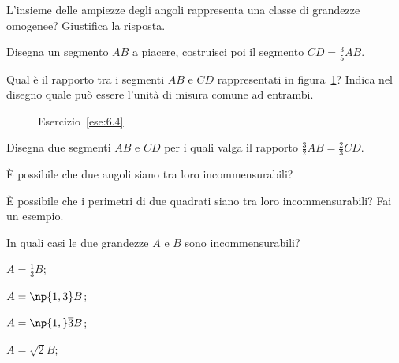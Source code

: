 \begin{esercizio}
\label{ese:6.2}
L'insieme delle ampiezze degli angoli rappresenta una classe di 
grandezze omogenee? Giustifica la risposta.
\end{esercizio}

\begin{esercizio}
\label{ese:6.3}
Disegna un segmento $AB$ a piacere, costruisci poi il segmento 
$CD=\frac{3}{5}AB$.
\end{esercizio}

\begin{esercizio}
\label{ese:6.4}
Qual è il rapporto tra i segmenti $AB$ e $CD$ rappresentati in 
figura~\ref{fig:ese6.4}? Indica nel disegno quale può essere l'unità 
di misura comune ad entrambi.
\end{esercizio}
\begin{inaccessibleblock}
 \begin{figure}[!htb]
  \centering
  \caption{Esercizio~\ref{ese:6.4}}\label{fig:ese6.4}
\end{figure}
\end{inaccessibleblock}

\begin{esercizio}
\label{ese:6.5}
Disegna due segmenti $AB$ e $CD$ per i quali valga il rapporto 
$\frac{3}{2}AB=\frac{2}{3}CD$.
\end{esercizio}

\begin{esercizio}
\label{ese:6.6}
È possibile che due angoli siano tra loro incommensurabili?
\end{esercizio}

\begin{esercizio}
\label{ese:6.7}
È possibile che i perimetri di due quadrati siano tra loro 
incommensurabili? Fai un esempio.
\end{esercizio}

\begin{esercizio}
\label{ese:6.8}
In quali casi le due grandezze $A$ e $B$ sono incommensurabili?
\begin{multicols}{4}
\begin{enumeratea}
\item $A=\frac{1}{3}B$;
\item $A=\np{1,3}B$;
\item $A=\np{1,}\overline{3}B$;
\item $A=\sqrt{2}B$;
\end{enumeratea}
\end{multicols}
\end{esercizio}

